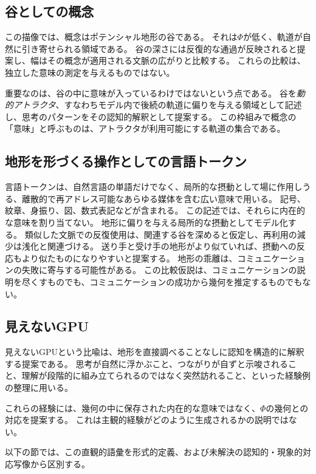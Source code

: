 \subsection{谷としての概念}
この描像では、概念はポテンシャル地形の谷である。
それは$\Phi$が低く、軌道が自然に引き寄せられる領域である。
谷の深さには反復的な通過が反映されると提案し、幅はその概念が適用される文脈の広がりと比較する。
これらの比較は、独立した意味の測定を与えるものではない。

重要なのは、谷の中に意味が入っているわけではないという点である。
谷を\emph{動的アトラクタ}、すなわちモデル内で後続の軌道に偏りを与える領域として記述し、思考のパターンをその認知的解釈として提案する。
この枠組みで概念の「意味」と呼ぶものは、アトラクタが利用可能にする軌道の集合である。

\subsection{地形を形づくる操作としての言語トークン}
言語トークンは、自然言語の単語だけでなく、局所的な摂動として場に作用しうる、離散的で再アドレス可能なあらゆる媒体を含む広い意味で用いる。
記号、紋章、身振り、図、数式表記などが含まれる。
この記述では、それらに内在的な意味を割り当てない。
地形に偏りを与える局所的な摂動としてモデル化する。
類似した文脈での反復使用は、関連する谷を深めると仮定し、再利用の減少は浅化と関連づける。
送り手と受け手の地形がより似ていれば、摂動への反応もより似たものになりやすいと提案する。
地形の乖離は、コミュニケーションの失敗に寄与する可能性がある。
この比較仮説は、コミュニケーションの説明を尽くすものでも、コミュニケーションの成功から幾何を推定するものでもない。

\subsection{見えないGPU}
見えないGPUという比喩は、地形を直接調べることなしに認知を構造的に解釈する提案である。
思考が自然に浮かぶこと、つながりが自ずと示唆されること、理解が段階的に組み立てられるのではなく突然訪れること、といった経験例の整理に用いる。

これらの経験には、幾何の中に保存された内在的な意味ではなく、$\Phi$の幾何との対応を提案する。
これは主観的経験がどのように生成されるかの説明ではない。

以下の節では、この直観的語彙を形式的定義、および未解決の認知的・現象的対応写像から区別する。
